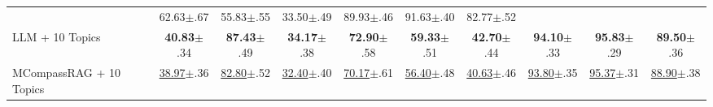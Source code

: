 \documentclass{llmxive}
\begin{document}
\begin{table}[h]
{\begin{tabular}{lccccccccc}
      & 62.63{\scriptsize$\pm$.67} & 55.83{\scriptsize$\pm$.55} & 33.50{\scriptsize$\pm$.49}
      & 89.93{\scriptsize$\pm$.46} & 91.63{\scriptsize$\pm$.40} & 82.77{\scriptsize$\pm$.52} \\
    LLM + 10 Topics
      & \textbf{40.83}{\scriptsize$\pm$.34} & \textbf{87.43}{\scriptsize$\pm$.49} & \textbf{34.17}{\scriptsize$\pm$.38}
      & \textbf{72.90}{\scriptsize$\pm$.58} & \textbf{59.33}{\scriptsize$\pm$.51} & \textbf{42.70}{\scriptsize$\pm$.44}
      & \textbf{94.10}{\scriptsize$\pm$.33} & \textbf{95.83}{\scriptsize$\pm$.29} & \textbf{89.50}{\scriptsize$\pm$.36} \\
    \hline
    \rowcolor{oursblue}
    MCompassRAG + 10 Topics
      & \underline{38.97}{\scriptsize$\pm$.36} & \underline{82.80}{\scriptsize$\pm$.52} & \underline{32.40}{\scriptsize$\pm$.40}
      & \underline{70.17}{\scriptsize$\pm$.61} & \underline{56.40}{\scriptsize$\pm$.48} & \underline{40.63}{\scriptsize$\pm$.46}
      & \underline{93.80}{\scriptsize$\pm$.35} & \underline{95.37}{\scriptsize$\pm$.31} & \underline{88.90}{\scriptsize$\pm$.38} \\
    \bottomrule
    \end{tabular}
    }%

    \vspace{2pt}


\end{table}
\end{document}
